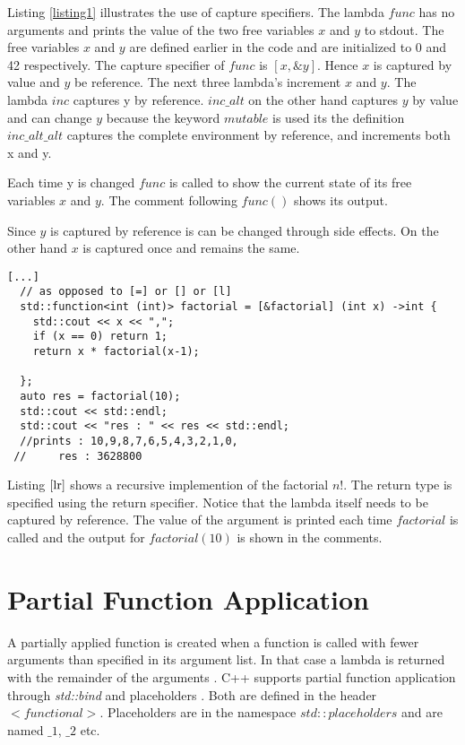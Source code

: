 \documentclass[12pt,fleqn]{article}
\begin{document}
Listing \ref{listing1} illustrates the use of capture specifiers.
The lambda $func$ has no arguments and prints the value of the two free variables $x$ and $y$ to stdout. 
The free variables $x$ and $y$ are defined earlier in the code and are initialized to 0 and 42 respectively. 
The capture specifier of $func$ is $[x,\&y]$.  
Hence $x$ is captured by value and $y$ be reference.
The next three lambda's increment $x$ and $y$.
The lambda $inc$ captures y by reference.
$inc\_alt$ on the other hand captures $y$ by value and can change $y$ because the keyword $mutable$ is used its the definition  
$inc\_alt\_alt$ captures the complete environment by reference, and increments both x and y.

Each time y is changed $func$ is called to show the current state of its free variables $x$ and $y$.
The comment following $func()$ shows its output. 

Since $y$ is captured by reference is can be changed through side effects.
On the other hand $x$ is captured once and remains the same.
%
\begin{lstlisting}[caption=Implementation of factorial using lambda recursion, label=lr]
[...]
  // as opposed to [=] or [] or [l]
  std::function<int (int)> factorial = [&factorial] (int x) ->int {
    std::cout << x << ",";
    if (x == 0) return 1;
    return x * factorial(x-1);
    
  };
  auto res = factorial(10);
  std::cout << std::endl;
  std::cout << "res : " << res << std::endl;
  //prints : 10,9,8,7,6,5,4,3,2,1,0,
 //     res : 3628800
\end{lstlisting}
%
Listing $\ref{lr}$ shows a recursive implemention of the factorial $n!$. 
The return type is specified using the return specifier.
Notice that the lambda itself needs to be captured by reference.
The value of the argument is printed each time $factorial$ is called and the output for $factorial(10)$ is shown in the comments.
 
\section*{Partial Function Application}
A partially applied function is created when a function is called with fewer arguments than specified in its argument list.
In that case a lambda is returned with the remainder of the arguments \cite{field}.
C++ supports partial function application through {\em std::bind} \cite{std::bind} and placeholders \cite{std::placeholder}.
Both are defined in the header $<functional>$. 
Placeholders are in the namespace $std::placeholders$ and are named $\_1$, $\_2$ etc.
\end{document}

